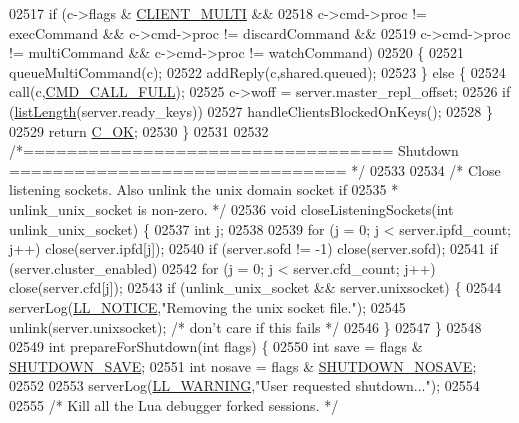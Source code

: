 \begin{DoxyCode}
{{{{{{{{{{{{{{{{{{{{{{{{{{{{{{{{02517     \textcolor{keywordflow}{if} (c->flags & \hyperlink{server_8h_a7f61f783f429419f8c593291a509b03a}{CLIENT\_MULTI} &&
02518         c->cmd->proc != execCommand && c->cmd->proc != discardCommand &&
02519         c->cmd->proc != multiCommand && c->cmd->proc != watchCommand)
02520     \{
02521         queueMultiCommand(c);
02522         addReply(c,shared.queued);
02523     \} \textcolor{keywordflow}{else} \{
02524         call(c,\hyperlink{server_8h_a7e92e38a9fe5f713cace24d63184273e}{CMD\_CALL\_FULL});
02525         c->woff = server.master\_repl\_offset;
02526         \textcolor{keywordflow}{if} (\hyperlink{adlist_8h_afde0ab079f934670e82119b43120e94b}{listLength}(server.ready\_keys))
02527             handleClientsBlockedOnKeys();
02528     \}
02529     \textcolor{keywordflow}{return} \hyperlink{server_8h_a303769ef1065076e68731584e758d3e1}{C\_OK};
02530 \}
02531 
02532 \textcolor{comment}{/*================================== Shutdown =============================== */}
02533 
02534 \textcolor{comment}{/* Close listening sockets. Also unlink the unix domain socket if}
02535 \textcolor{comment}{ * unlink\_unix\_socket is non-zero. */}
02536 \textcolor{keywordtype}{void} closeListeningSockets(\textcolor{keywordtype}{int} unlink\_unix\_socket) \{
02537     \textcolor{keywordtype}{int} j;
02538 
02539     \textcolor{keywordflow}{for} (j = 0; j < server.ipfd\_count; j++) close(server.ipfd[j]);
02540     \textcolor{keywordflow}{if} (server.sofd != -1) close(server.sofd);
02541     \textcolor{keywordflow}{if} (server.cluster\_enabled)
02542         \textcolor{keywordflow}{for} (j = 0; j < server.cfd\_count; j++) close(server.cfd[j]);
02543     \textcolor{keywordflow}{if} (unlink\_unix\_socket && server.unixsocket) \{
02544         serverLog(\hyperlink{server_8h_a8c54c191e436c7dd3012167212692401}{LL\_NOTICE},\textcolor{stringliteral}{"Removing the unix socket file."});
02545         unlink(server.unixsocket); \textcolor{comment}{/* don't care if this fails */}
02546     \}
02547 \}
02548 
02549 \textcolor{keywordtype}{int} prepareForShutdown(\textcolor{keywordtype}{int} flags) \{
02550     \textcolor{keywordtype}{int} save = flags & \hyperlink{server_8h_ada761b94960fa20ff86d56b403b26861}{SHUTDOWN\_SAVE};
02551     \textcolor{keywordtype}{int} nosave = flags & \hyperlink{server_8h_a834b7e50f783a1eeaa1feea05fce199e}{SHUTDOWN\_NOSAVE};
02552 
02553     serverLog(\hyperlink{server_8h_a31229b9334bba7d6be2a72970967a14b}{LL\_WARNING},\textcolor{stringliteral}{"User requested shutdown..."});
02554 
02555     \textcolor{comment}{/* Kill all the Lua debugger forked sessions. */}
}}}}}}}}}}}}}}}}}}}}}}}}}}}}}}}}
\end{DoxyCode}
